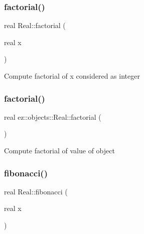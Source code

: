 \subsubsection{\texorpdfstring{factorial()}{factorial()}\hspace{0.1cm}{\footnotesize\ttfamily [1/2]}}
{\footnotesize\ttfamily real Real\+::factorial (\begin{DoxyParamCaption}\item[{real}]{x }\end{DoxyParamCaption})\hspace{0.3cm}{\ttfamily [static]}}

Compute factorial of x considered as integer \mbox{\label{classez_1_1objects_1_1Real_a3fde204357baf3d2b681bca4407550ec}} 
\subsubsection{\texorpdfstring{factorial()}{factorial()}\hspace{0.1cm}{\footnotesize\ttfamily [2/2]}}
{\footnotesize\ttfamily real ez\+::objects\+::\+Real\+::factorial (\begin{DoxyParamCaption}{ }\end{DoxyParamCaption})\hspace{0.3cm}{\ttfamily [inline]}}

Compute factorial of value of object \mbox{\label{classez_1_1objects_1_1Real_aaf98cb65719546ff7aa8833d08bfbace}} 
\subsubsection{\texorpdfstring{fibonacci()}{fibonacci()}\hspace{0.1cm}{\footnotesize\ttfamily [1/2]}}
{\footnotesize\ttfamily real Real\+::fibonacci (\begin{DoxyParamCaption}\item[{real}]{x }\end{DoxyParamCaption})\hspace{0.3cm}{\ttfamily [static]}}

